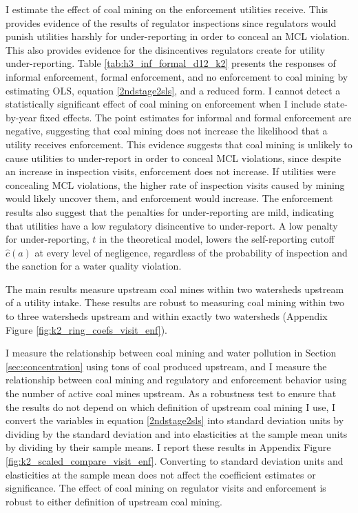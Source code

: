 \documentclass[12pt]{article}
\begin{document}
I estimate the effect of coal mining on the enforcement utilities receive. This provides evidence of the results of regulator inspections since regulators would punish utilities harshly for under-reporting in order to conceal an MCL violation. This also provides evidence for the disincentives regulators create for utility under-reporting. Table \ref{tab:h3_inf_formal_d12_k2} presents the responses of informal enforcement, formal enforcement, and no enforcement to coal mining by estimating OLS, equation \ref{2ndstage2sls}, and a reduced form. I cannot detect a statistically significant effect of coal mining on enforcement when I include state-by-year fixed effects. The point estimates for informal and formal enforcement are negative, suggesting that coal mining does not increase the likelihood that a utility receives enforcement. This evidence suggests that coal mining is unlikely to cause utilities to under-report in order to conceal MCL violations, since despite an increase in inspection visits, enforcement does not increase. If utilities were concealing MCL violations, the higher rate of inspection visits caused by mining would likely uncover them, and enforcement would increase. The enforcement results also suggest that the penalties for under-reporting are mild, indicating that utilities have a low regulatory disincentive to under-report. A low penalty for under-reporting, $t$ in the theoretical model, lowers the self-reporting cutoff $\hat{c}(a)$ at every level of negligence, regardless of the probability of inspection and the sanction for a water quality violation.

The main results measure upstream coal mines within two watersheds upstream of a utility intake. These results are robust to measuring coal mining within two to three watersheds upstream and within exactly two watersheds (Appendix Figure \ref{fig:k2_ring_coefs_visit_enf}).

I measure the relationship between coal mining and water pollution in Section \ref{sec:concentration} using tons of coal produced upstream, and I measure the relationship between coal mining and regulatory and enforcement behavior using the number of active coal mines upstream. As a robustness test to ensure that the results do not depend on which definition of upstream coal mining I use, I convert the variables in equation \ref{2ndstage2sls} into standard deviation units by dividing by the standard deviation and into elasticities at the sample mean units by dividing by their sample means. I report these results in Appendix Figure \ref{fig:k2_scaled_compare_visit_enf}. Converting to standard deviation units and elasticities at the sample mean does not affect the coefficient estimates or significance. The effect of coal mining on regulator visits and enforcement is robust to either definition of upstream coal mining.
\end{document}
